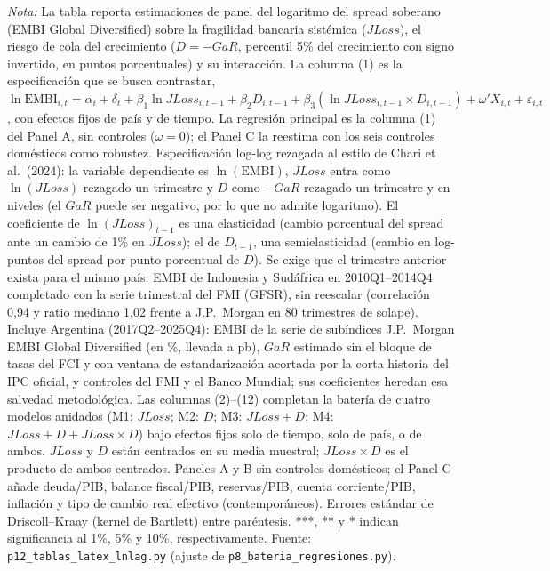 \begin{landscape}
\begin{table}
\par\smallskip\parbox{\linewidth}{\scriptsize \textit{Nota:} La tabla reporta estimaciones de panel del logaritmo del spread soberano (EMBI Global Diversified) sobre la fragilidad bancaria sistémica ($JLoss$), el riesgo de cola del crecimiento ($D=-GaR$, percentil 5\% del crecimiento con signo invertido, en puntos porcentuales) y su interacción. La columna (1) es la especificación que se busca contrastar, $\ln\mathrm{EMBI}_{i,t}=\alpha_i+\delta_t+\beta_1\ln JLoss_{i,t-1}+\beta_2 D_{i,t-1}+\beta_3(\ln JLoss_{i,t-1}\times D_{i,t-1})+\omega'X_{i,t}+\varepsilon_{i,t}$, con efectos fijos de país y de tiempo. La regresión principal es la columna (1) del Panel A, sin controles ($\omega=0$); el Panel C la reestima con los seis controles domésticos como robustez. Especificación log-log rezagada al estilo de Chari et al.\ (2024): la variable dependiente es $\ln(\mathrm{EMBI})$, $JLoss$ entra como $\ln(JLoss)$ rezagado un trimestre y $D$ como $-GaR$ rezagado un trimestre y en niveles (el $GaR$ puede ser negativo, por lo que no admite logaritmo). El coeficiente de $\ln(JLoss)_{t-1}$ es una elasticidad (cambio porcentual del spread ante un cambio de 1\% en $JLoss$); el de $D_{t-1}$, una semielasticidad (cambio en log-puntos del spread por punto porcentual de $D$). Se exige que el trimestre anterior exista para el mismo país. EMBI de Indonesia y Sudáfrica en 2010Q1--2014Q4 completado con la serie trimestral del FMI (GFSR), sin reescalar (correlación 0,94 y ratio mediano 1,02 frente a J.P.\ Morgan en 80 trimestres de solape). Incluye Argentina (2017Q2--2025Q4): EMBI de la serie de subíndices J.P.\ Morgan EMBI Global Diversified (en \%, llevada a pb), $GaR$ estimado sin el bloque de tasas del FCI y con ventana de estandarización acortada por la corta historia del IPC oficial, y controles del FMI y el Banco Mundial; sus coeficientes heredan esa salvedad metodológica. Las columnas (2)--(12) completan la batería de cuatro modelos anidados (M1: $JLoss$; M2: $D$; M3: $JLoss+D$; M4: $JLoss+D+JLoss\times D$) bajo efectos fijos solo de tiempo, solo de país, o de ambos. $JLoss$ y $D$ están centrados en su media muestral; $JLoss\times D$ es el producto de ambos centrados. Paneles A y B sin controles domésticos; el Panel C añade deuda/PIB, balance fiscal/PIB, reservas/PIB, cuenta corriente/PIB, inflación y tipo de cambio real efectivo (contemporáneos). Errores estándar de Driscoll--Kraay (kernel de Bartlett) entre paréntesis. ***, ** y * indican significancia al 1\%, 5\% y 10\%, respectivamente. Fuente: \texttt{p12\_tablas\_latex\_lnlag.py} (ajuste de \texttt{p8\_bateria\_regresiones.py}).}
\end{table}
\end{landscape}
